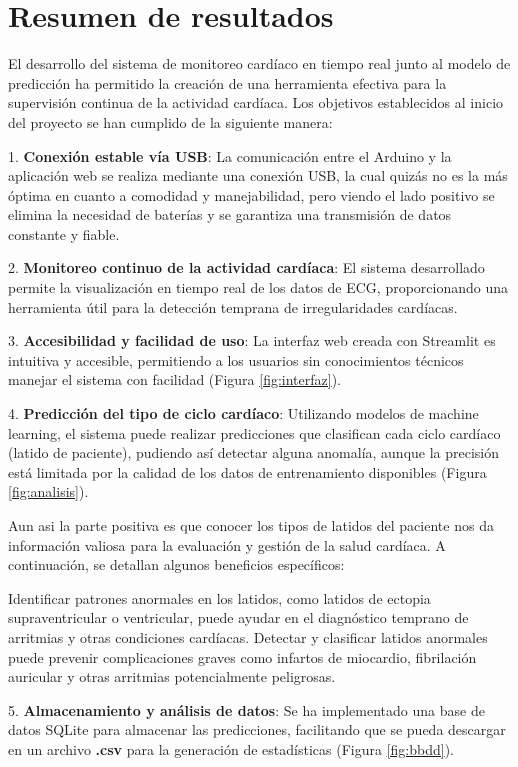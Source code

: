
\section{Resumen de resultados}

El desarrollo del sistema de monitoreo cardíaco en tiempo real junto al modelo de predicción ha permitido la creación de una herramienta efectiva para la supervisión continua de la actividad cardíaca. Los objetivos establecidos al inicio del proyecto se han cumplido de la siguiente manera:

1. \textbf{Conexión estable vía USB}: La comunicación entre el Arduino y la aplicación web se realiza mediante una conexión USB, la cual quizás no es la más óptima en cuanto a comodidad y manejabilidad, pero viendo el lado positivo se elimina la necesidad de baterías y se garantiza una transmisión de datos constante y fiable.

2. \textbf{Monitoreo continuo de la actividad cardíaca}: El sistema desarrollado permite la visualización en tiempo real de los datos de ECG, proporcionando una herramienta útil para la detección temprana de irregularidades cardíacas.

3. \textbf{Accesibilidad y facilidad de uso}: La interfaz web creada con Streamlit es intuitiva y accesible, permitiendo a los usuarios sin conocimientos técnicos manejar el sistema con facilidad (Figura \ref{fig:interfaz}).

4. \textbf{Predicción del tipo de ciclo cardíaco}: Utilizando modelos de machine learning, el sistema puede realizar predicciones que clasifican cada ciclo cardíaco (latido de paciente), pudiendo así detectar alguna anomalía, aunque la precisión está limitada por la calidad de los datos de entrenamiento disponibles (Figura \ref{fig:analisis}).

Aun asi la parte positiva es que conocer los tipos de latidos del paciente nos da información valiosa para la evaluación y gestión de la salud cardíaca. A continuación, se detallan algunos beneficios específicos:

Identificar patrones anormales en los latidos, como latidos de ectopia supraventricular o ventricular, puede ayudar en el diagnóstico temprano de arritmias y otras condiciones cardíacas.
Detectar y clasificar latidos anormales puede prevenir complicaciones graves como infartos de miocardio, fibrilación auricular y otras arritmias potencialmente peligrosas.

5. \textbf{Almacenamiento y análisis de datos}: Se ha implementado una base de datos SQLite para almacenar las predicciones, facilitando que se pueda descargar en un archivo \textbf{.csv} para la generación de estadísticas (Figura \ref{fig:bbdd}).


